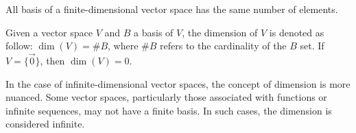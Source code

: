 \begin{tcolorbox}[colback=def_color,colframe=gray,coltext=black] \begin{theorem}
    All basis of a finite-dimensional vector space has the same number of elements.
\end{theorem}
\end{tcolorbox}

\begin{tcolorbox}[colback=def_color,coltitle=black,coltext=black,colframe=pro_color_back,title=\textbf{Proof}]
\end{tcolorbox}

\begin{tcolorbox}[colback=def_color,colframe=gray] \begin{definition}
    Given a vector space $V$ and $B$ a basis of $V$, the dimension of $V$ is denoted as follow: $\dim(V) = \#B$, where $\#B$ refers to the cardinality of the $B$ set. If $V = \{\vec 0\}$, then $\dim(V) = 0.$
\end{definition}
\end{tcolorbox}

In the case of infinite-dimensional vector spaces, the concept of dimension is more nuanced. Some vector spaces, particularly those associated with functions or infinite sequences, may not have a finite basis. In such cases, the dimension is considered infinite.

\fi